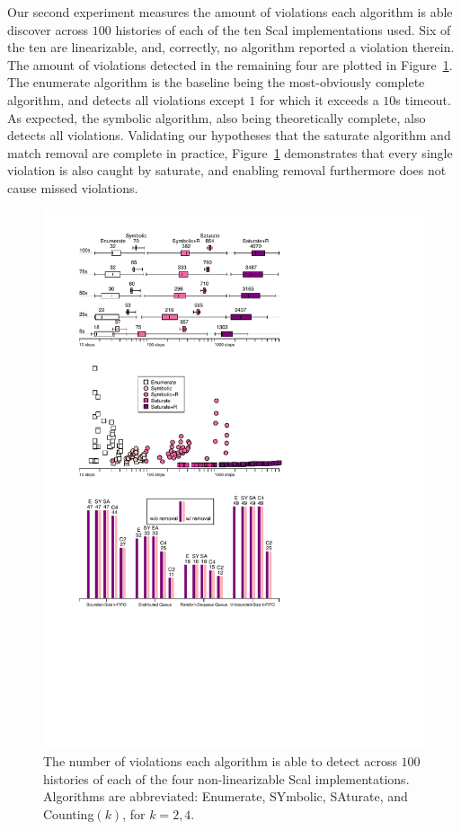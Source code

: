 Our second experiment measures the amount of violations each algorithm is able
discover across $100$ histories of each of the ten Scal implementations used.
Six of the ten are linearizable, and, correctly, no algorithm reported a
violation therein. The amount of violations detected in the remaining four are
plotted in Figure~\ref{fig:violations}. The {\sc enumerate} algorithm is the
baseline being the most-obviously complete algorithm, and detects all
violations except $1$ for which it exceeds a $10$s timeout. As expected, the
{\sc symbolic} algorithm, also being theoretically complete, also detects all
violations. Validating our hypotheses that the {\sc saturate} algorithm and
match removal are complete in practice, Figure~\ref{fig:violations}
demonstrates that every single violation is also caught by {\sc saturate}, and
enabling removal furthermore does not cause missed violations.

\begin{figure}[t]

  \centering
  \includegraphics[width=\linewidth]{figures/violations-covered}

  \caption{The number of violations each algorithm is able to detect across
  $100$ histories of each of the four non-linearizable Scal implementations.
  Algorithms are abbreviated: {\sc Enumerate}, {\sc SYmbolic}, {\sc SAturate},
  and {\sc Counting}$(k)$, for $k = 2,4$.}

  \label{fig:violations}

\end{figure}

